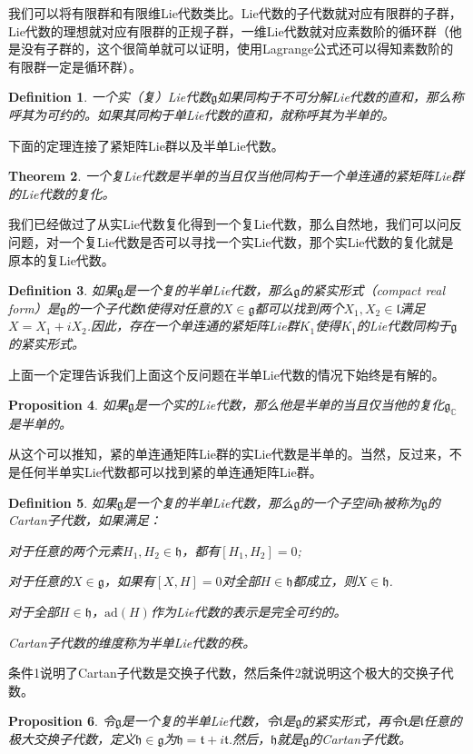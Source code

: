 \documentclass[9pt]{extbook}
\theoremstyle{plain}
\newtheorem{defi}{Definition}
\newtheorem{pro}[defi]{Proposition}
\newtheorem{theo}[defi]{Theorem}
\newcommand{\cc}{\mathbb{C}}
\newcommand{\lag}{{\mathfrak{g}}}  %
\newcommand{\ad}{{\mathrm{ad}}}
\begin{document}
我们可以将有限群和有限维Lie代数类比。Lie代数的子代数就对应有限群的子群，Lie代数的理想就对应有限群的正规子群，一维Lie代数就对应素数阶的循环群（他是没有子群的，这个很简单就可以证明，使用Lagrange公式还可以得知素数阶的有限群一定是循环群）。

\begin{defi}
一个实（复）Lie代数$\lag$如果同构于不可分解Lie代数的直和，那么称呼其为可约的。如果其同构于单Lie代数的直和，就称呼其为半单的。
\end{defi}
下面的定理连接了紧矩阵Lie群以及半单Lie代数。
\begin{theo}
一个复Lie代数是半单的当且仅当他同构于一个单连通的紧矩阵Lie群的Lie代数的复化。
\end{theo}
我们已经做过了从实Lie代数复化得到一个复Lie代数，那么自然地，我们可以问反问题，对一个复Lie代数是否可以寻找一个实Lie代数，那个实Lie代数的复化就是原本的复Lie代数。
\begin{defi}
如果$\lag$是一个复的半单Lie代数，那么$\lag$的紧实形式（compact real form）是$\lag$的一个子代数$\mathfrak{l}$使得对任意的$X\in\lag$都可以找到两个$X_1,X_2\in\mathfrak{l}$满足$X=X_1+iX_2$.因此，存在一个单连通的紧矩阵Lie群$K_1$使得$K_1$的Lie代数同构于$\lag$的紧实形式。
\end{defi}
上面一个定理告诉我们上面这个反问题在半单Lie代数的情况下始终是有解的。
\begin{pro}
如果$\lag$是一个实的Lie代数，那么他是半单的当且仅当他的复化$\lag_\cc$是半单的。
\end{pro}
从这个可以推知，紧的单连通矩阵Lie群的实Lie代数是半单的。当然，反过来，不是任何半单实Lie代数都可以找到紧的单连通矩阵Lie群。
\begin{defi}
如果$\lag$是一个复的半单Lie代数，那么$\lag$的一个子空间$\mathfrak{h}$被称为$\lag$的Cartan子代数，如果满足：

 对于任意的两个元素$H_1,H_2\in\mathfrak{h}$，都有$[H_1,H_2]=0$;

 对于任意的$X\in \lag$，如果有$[X,H]=0$对全部$H\in\mathfrak{h}$都成立，则$X\in \mathfrak{h}$.

 对于全部$H\in \mathfrak{h}$，$\ad(H)$作为Lie代数的表示是完全可约的。

Cartan子代数的维度称为半单Lie代数的秩。
\end{defi}
条件1说明了Cartan子代数是交换子代数，然后条件2就说明这个极大的交换子代数。
\begin{pro}
令$\lag$是一个复的半单Lie代数，令$\mathfrak{l}$是$\lag$的紧实形式，再令$\mathfrak{t}$是$\mathfrak{l}$任意的极大交换子代数，定义$\mathfrak{h}\in\lag$为$\mathfrak{h}=\mathfrak{t}+i\mathfrak{t}$.然后，$\mathfrak{h}$就是$\lag$的Cartan子代数。
\end{pro}
\end{document}
